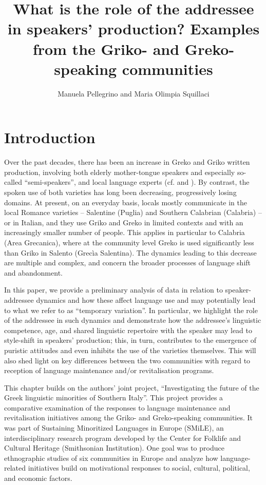\documentclass[output=paper,hidelinks]{langscibook}
\author{Manuela Pellegrino\affiliation{CHS, Harvard University} and Maria Olimpia Squillaci\affiliation{University of Naples “L’ Orientale”}}
\title{What is the role of the addressee in speakers’ production? Examples from the Griko- and Greko-speaking communities }
\begin{document}
\maketitle

\section{{Introduction}}

Over the past decades, there has been an increase in Greko and Griko written production, involving both elderly mother-tongue speakers and especially so-called ``semi-speakers'', and local language experts (cf. \citealt{Martino2009} and \citealt{Pellegrino2016a}). By contrast, the spoken use of both varieties has long been decreasing, progressively losing domains. At present, on an everyday basis, locals mostly communicate in the local Romance varieties -- Salentine (Puglia) and Southern Calabrian (Calabria) -- or in Italian, and they use Griko and Greko in limited contexts and with an increasingly smaller number of people. This applies in particular to Calabria (Area Grecanica), where at the community level Greko is used significantly less than Griko in Salento (Grecìa Salentina). The dynamics leading to this decrease are multiple and complex, and concern the broader processes of language shift and abandonment.



In this paper, we provide a preliminary analysis of data in relation to speaker-addressee dynamics and how these affect language use and may potentially lead to what we refer to as ``temporary variation''. In particular, we highlight the role of the addressee in such dynamics and demonstrate how the addressee’s linguistic competence, age, and shared linguistic repertoire with the speaker may lead to style-shift in speakers’ production; this, in turn, contributes to the emergence of puristic attitudes and even inhibits the use of the varieties themselves. This will also shed light on key differences between the two communities with regard to reception of language maintenance and/or revitalisation programs. 



This chapter builds on the authors’ joint project, “Investigating the future of the Greek linguistic minorities of Southern Italy”. This project provides a comparative examination of the responses to language maintenance and revitalisation initiatives among the Griko- and Greko-speaking communities. It was part of Sustaining Minoritized Languages in Europe (SMiLE), an interdisciplinary research program developed by the Center for Folklife and Cultural Heritage (Smithsonian Institution). One goal was to produce ethnographic studies of six communities in Europe and analyze how language-related initiatives build on motivational responses to social, cultural, political, and economic factors.
\end{document}
